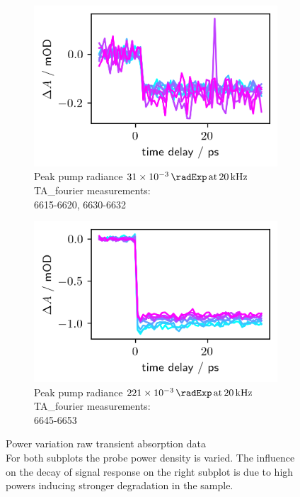 \documentclass[twoside,openright]{scrreprt}
\def\pumpExp#1{\ensuremath{\SI{#1}{\radExp}\,\mathrm{at}\, \SI{20}{\kilo\hertz}}}
\begin{document}
\begin{figure}[hbtp]
\centering
\begin{subfigure}[t]{0.45\textwidth}
\centering
\includegraphics[scale=1]{images/PowerVarLowPumpVarProbe.png} 
\caption{Peak pump radiance \pumpExp{31e-3}\\TA\_fourier measurements:\\ 6615-6620, 6630-6632\label{fig:PowerVarL}}
\end{subfigure}
\hfill
\begin{subfigure}[t]{0.45\textwidth}
\centering
\includegraphics[scale=1]{images/PowerVarHighPumpVariedProbe.png} 
\caption{Peak pump radiance \pumpExp{221e-3}\\TA\_fourier measurements:\\ 6645-6653\label{fig:PowerVarR}}
\end{subfigure}
\caption{Power variation raw transient absorption data\\
For both subplots the probe power density is varied. The influence on the decay of signal response on the right subplot is due to high powers inducing stronger degradation in the sample.}
\end{figure}
\end{document}
